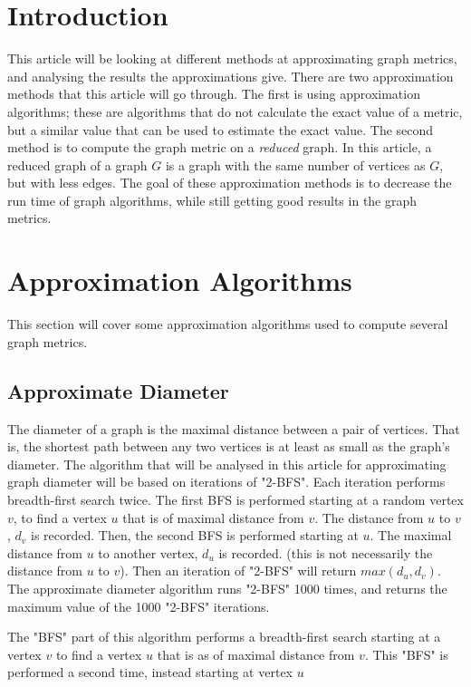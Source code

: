 \documentclass[11pt]{article}
\begin{document}
\section{Introduction}
This article will be looking at different methods at approximating graph metrics, and analysing the results the approximations give.  There are two approximation methods that this article will go through.  The first is using approximation algorithms; these are algorithms that do not calculate the exact value of a metric, but a similar value that can be used to estimate the exact value.  The second method is to compute the graph metric on a \textit{reduced} graph. In this article, a reduced graph of a graph $G$ is a graph with the same number of vertices as $G$, but with less edges.  The goal of these approximation methods is to decrease the run time of graph algorithms, while still getting good results in the graph metrics.

\section{Approximation Algorithms}
This section will cover some approximation algorithms used to compute several graph metrics.\\
\subsection{Approximate Diameter} 
The diameter of a graph is the maximal distance between a pair of vertices.  That is, the shortest path between any two vertices is at least as small as the graph's diameter.  The algorithm that will be analysed in this article for approximating graph diameter will be based on iterations of "2-BFS".  Each iteration performs breadth-first search twice.  The first BFS is performed starting at a random vertex $v$, to find a vertex $u$ that is of maximal distance from $v$.  The distance from $u$ to $v$, $d_v$ is recorded.  Then, the second BFS is performed starting at $u$.  The maximal distance from $u$ to another vertex, $d_u$ is recorded. (this is not necessarily the distance from $u$ to $v$).  Then an iteration of "2-BFS" will return $max(d_u, d_v)$.  The approximate diameter algorithm runs "2-BFS" 1000 times, and returns the maximum value of the 1000 "2-BFS" iterations.

The "BFS" part of this algorithm performs a breadth-first search starting at a vertex $v$ to find a vertex $u$ that is as of maximal distance from $v$. This "BFS" is performed a second time, instead starting at vertex $u$
\end{document}
